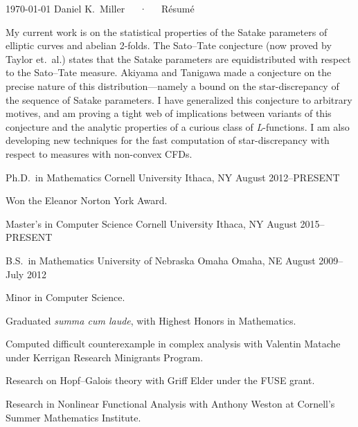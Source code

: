 \documentclass[11pt, letterpaper]{awesome-cv}
\begin{document}
\makecvheader

\makecvfooter
  {\today}
  {Daniel K.~Miller~~~·~~~Résumé}
  {\thepage}



\begin{cvparagraph}

My current work is on the statistical properties of the Satake parameters of elliptic curves and abelian 2-folds. The Sato--Tate conjecture (now proved by Taylor et.~al.) states that the Satake parameters are equidistributed with respect to the Sato--Tate measure. Akiyama and Tanigawa made a conjecture on the precise nature of this distribution---namely a bound on the star-discrepancy of the sequence of Satake parameters. I have generalized this conjecture to arbitrary motives, and am proving a tight web of implications between variants of this conjecture and the analytic properties of a curious class of \emph{L}-functions. I am also 
developing new techniques for the fast computation of star-discrepancy with respect to measures with non-convex CFDs. 
\end{cvparagraph}






\begin{cventries}

\cventry
	{Ph.D.~in Mathematics}
	{Cornell University}
	{Ithaca, NY}
	{August 2012--PRESENT}
	{
		\begin{cvitems}
			\item{Won the Eleanor Norton York Award.}
		\end{cvitems}
	}
	
\cventry
	{Master's in Computer Science}
	{Cornell University}
	{Ithaca, NY}
	{August 2015--PRESENT}
	{}
	
\cventry
	{B.S.~in Mathematics}
	{University of Nebraska Omaha}
	{Omaha, NE}
	{August 2009--July 2012}
	{
		\begin{cvitems}
			\item{Minor in Computer Science.}
			\item{Graduated \emph{summa cum laude}, with Highest Honors in Mathematics.}
			\item{Computed difficult counterexample in complex analysis with Valentin Matache under Kerrigan Research Minigrants Program.}
			\item{Research on Hopf--Galois theory with Griff Elder under the FUSE grant.}
			\item{Research in Nonlinear Functional Analysis with Anthony Weston at Cornell's Summer Mathematics Institute.}
		\end{cvitems}
	}
	
\end{cventries}
\end{document}
